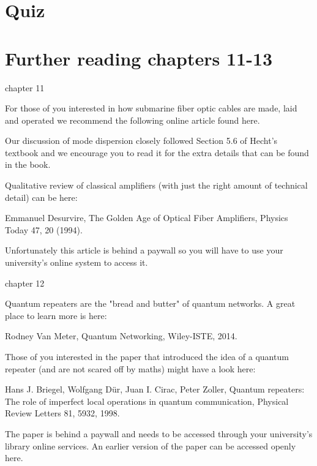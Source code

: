 \newpage
\section*{Quiz}


\section*{Further reading chapters 11-13}

chapter 11

For those of you interested in how submarine fiber optic cables are made, laid and operated we recommend the following online article found here.

Our discussion of mode dispersion closely followed Section 5.6 of Hecht’s textbook and we encourage you to read it for the extra details that can be found in the book.

Qualitative review of classical amplifiers (with just the right amount of technical detail) can be here:

Emmanuel Desurvire, The Golden Age of Optical Fiber Amplifiers, Physics Today 47, 20 (1994).

Unfortunately this article is behind a paywall so you will have to use your university’s online system to access it.

chapter 12

Quantum repeaters are the "bread and butter" of quantum networks. A great place to learn more is here:

Rodney Van Meter, Quantum Networking, Wiley-ISTE, 2014.

Those of you interested in the paper that introduced the idea of a quantum repeater (and are not scared off by maths) might have a look here:

Hans J. Briegel, Wolfgang Dür, Juan I. Cirac, Peter Zoller, Quantum repeaters: The role of imperfect local operations in quantum communication, Physical Review Letters 81, 5932, 1998.

The paper is behind a paywall and needs to be accessed through your university’s library online services. An earlier version of the paper can be accessed openly here.

